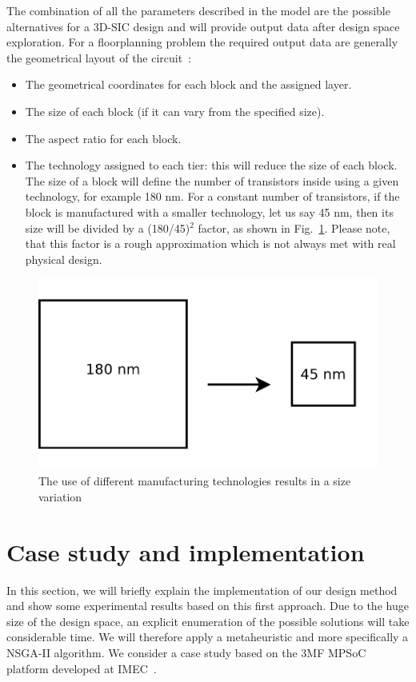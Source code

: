 The combination of all the parameters described in the model are the possible alternatives for a 3D-SIC design and will provide output data after design space exploration. For a floorplanning problem the required output data are generally the geometrical layout of the circuit~\cite{DBLP:conf/3dic/MilojevicCCRRSAPM09}:
\begin{itemize}
\item The geometrical coordinates for each block and the assigned layer.
\item The size of each block (if it can vary from the specified size).
\item The aspect ratio for each block.
\item The technology assigned to each tier: this will reduce the size of each block. The size of a block will define the number of transistors inside using a given technology, for example 180 nm. For a constant number of transistors, if the block is manufactured with a smaller technology, let us say 45 nm, then its size will be divided by a (180/45)$^2$ factor, as shown in Fig.~\ref{fig:tech_ex}. Please note, that this factor is a rough approximation which is not always met with real physical design.
\end{itemize}

\begin{figure}[h!]
\begin{center}
\includegraphics[width=0.9\linewidth]{tech_ex.pdf}
\end{center}
\vspace{-0.5cm}
\caption{The use of different manufacturing technologies results in a size variation}
\label{fig:tech_ex}
\end{figure}

\section{Case study and implementation}
In this section, we will briefly explain the implementation of our design method and show some experimental results based on this first approach. Due to the huge size of the design space, an explicit enumeration of the possible solutions will take considerable time. We will therefore apply a metaheuristic and more specifically a NSGA-II algorithm. We consider a case study based on the 3MF MPSoC platform developed at IMEC~\cite{dmilojev08b}.

